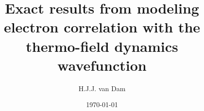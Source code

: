 \documentclass[aip,graphicx]{revtex4-1}
\begin{document}

\newlength{\classpageheight}
\setlength{\classpageheight}{\pdfpageheight}
\newlength{\classpagewidth}
\setlength{\classpagewidth}{\pdfpagewidth}


\title[Exact results from modeling electron correlation with the thermo-field dynamics wavefunction]{Exact results from modeling electron correlation with the thermo-field dynamics wavefunction} %



\author{H.J.J. van Dam}


\date{\today}

\begin{abstract}
\end{abstract}

\pacs{}%

\maketitle %

\tableofcontents
\newpage
\end{document}
